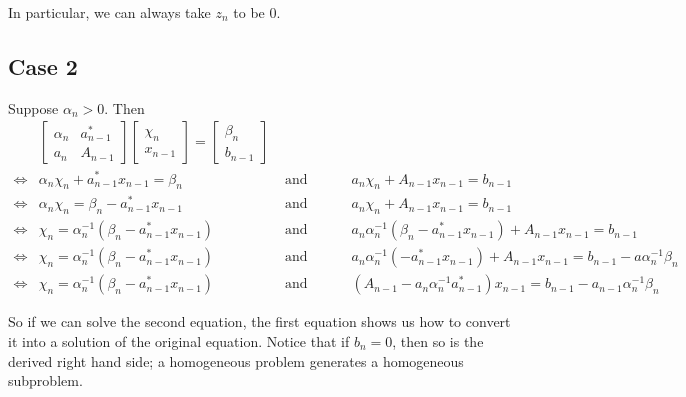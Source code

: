 \documentclass{article}
\begin{document}
In particular, we can always take $z_n$ to be 0.

\subsection{Case 2}
Suppose $\alpha_n>0$. Then
\begin{align*}
&\begin{bmatrix}\alpha_n & a_{n-1}^* \\ a_n & A_{n-1}\end{bmatrix}\begin{bmatrix}\chi_n\\x_{n-1}\end{bmatrix}=\begin{bmatrix}\beta_n\\b_{n-1}\end{bmatrix}
\\\iff&
\alpha_n\chi_n + a_{n-1}^*x_{n-1} = \beta_n &\text{ and }\hspace{2em}&
a_n\chi_n + A_{n-1}x_{n-1} = b_{n-1}
\\\iff&
\alpha_n\chi_n= \beta_n - a_{n-1}^*x_{n-1}  &\text{ and }\hspace{2em}&
a_n\chi_n + A_{n-1}x_{n-1} = b_{n-1}
\\\iff&
\chi_n= \alpha_n^{-1}(\beta_n - a_{n-1}^*x_{n-1}) &\text{ and }\hspace{2em}&
a_n\alpha_n^{-1}(\beta_n - a_{n-1}^*x_{n-1}) + A_{n-1}x_{n-1} = b_{n-1}
\\\iff&
\chi_n= \alpha_n^{-1}(\beta_n - a_{n-1}^*x_{n-1}) &\text{ and }\hspace{2em}&
a_n\alpha_n^{-1}(- a_{n-1}^*x_{n-1}) + A_{n-1}x_{n-1} = b_{n-1}-a\alpha_n^{-1}\beta_n
\\\iff&
\chi_n= \alpha_n^{-1}(\beta_n - a_{n-1}^*x_{n-1}) &\text{ and }\hspace{2em}&
(A_{n-1} - a_n\alpha_n^{-1}a_{n-1}^*)x_{n-1} = b_{n-1}-a_{n-1}\alpha_n^{-1}\beta_n
\end{align*}

  
So if we can solve the second equation, the first equation shows us how to convert it into a solution
of the original equation. Notice that if 
$b_n =0 $, then so is the derived right hand side; a homogeneous problem generates
a homogeneous subproblem.
\end{document}
